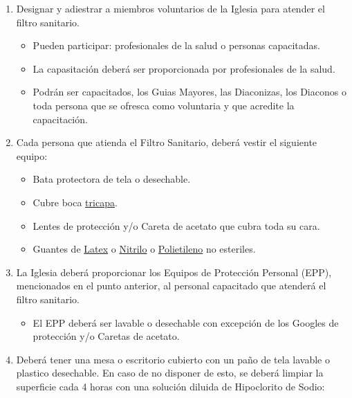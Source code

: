 \documentclass[]{article}
\providecommand{\tightlist}{%
  \setlength{\itemsep}{0pt}\setlength{\parskip}{0pt}}
\begin{document}
\begin{enumerate}
\def\labelenumi{\arabic{enumi}.}
\tightlist
\item
  Designar y adiestrar a miembros voluntarios de la Iglesia para atender
  el filtro sanitario.

  \begin{itemize}
  \tightlist
  \item
    Pueden participar: profesionales de la salud o personas capacitadas.
  \item
    La capasitación deberá ser proporcionada por profesionales de la
    salud.
  \item
    Podrán ser capacitados, los Guias Mayores, las Diaconizas, los
    Diaconos o toda persona que se ofresca como voluntaria y que
    acredite la capacitación.
  \end{itemize}
\item
  Cada persona que atienda el Filtro Sanitario, deberá vestir el
  siguiente equipo:

  \begin{itemize}
  \tightlist
  \item
    Bata protectora de tela o desechable.
  \item
    Cubre boca
    \href{https://www.bypmedical.com.mx/producto/cubrebocas-tricapa-fda/}{tricapa}.
  \item
    Lentes de protección y/o Careta de acetato que cubra toda su cara.
  \item
    Guantes de
    \href{https://www.homedepot.com.mx/seguridad/equipo-de-seguridad/guantes/guante-de-latex-desechable-10-piezas-133909}{Latex}
    o
    \href{https://www.homedepot.com.mx/seguridad/equipo-de-seguridad/guantes/guante-nitrilo-desechable-107411}{Nitrilo}
    o
    \href{http://rygsac.com/indumentaria-de-un-solo-uso/alimentario-de-un-solo-uso/guantes-de-polietileno}{Polietileno}
    no esteriles.
  \end{itemize}
\item
  La Iglesia deberá proporcionar los Equipos de Protección Personal
  (EPP), mencionados en el punto anterior, al personal capacitado que
  atenderá el filtro sanitario.

  \begin{itemize}
  \tightlist
  \item
    El EPP deberá ser lavable o desechable con excepción de los Googles
    de protección y/o Caretas de acetato.
  \end{itemize}
\item
  Deberá tener una mesa o escritorio cubierto con un paño de tela
  lavable o plastico desechable. En caso de no disponer de esto, se
  deberá limpiar la superficie cada 4 horas con una solución diluida de
  Hipoclorito de Sodio:
\end{enumerate}
\end{document}
